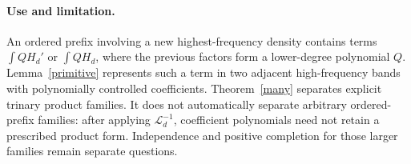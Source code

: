 \documentclass[11pt]{article}
\begin{document}
\paragraph{Use and limitation.}
An ordered prefix involving a new highest-frequency density contains
terms $\int QH_d'$ or $\int QH_d$, where the previous factors form a
lower-degree polynomial $Q$. Lemma~\ref{primitive} represents such a
term in two adjacent high-frequency bands with polynomially controlled
coefficients. Theorem~\ref{many} separates explicit trinary product
families. It does not automatically separate arbitrary ordered-prefix
families: after applying $\mathcal L_d^{-1}$, coefficient polynomials
need not retain a prescribed product form. Independence and positive
completion for those larger families remain separate questions.
\end{document}
